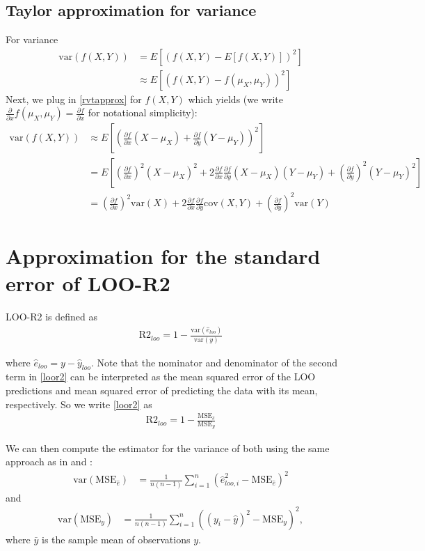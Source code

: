 \documentclass{article}
\begin{document}
\subsection{Taylor approximation for variance}
For variance
\begin{align}
    \text{var}(f(X, Y)) &= E\left[ \left(f(X, Y) - E[f(X,Y)] \right)^2 \right] \nonumber \\
    &\approx E\left[ \left( f(X, Y) - f(\mu_X, \mu_Y) \right)^2 \right] \nonumber
\end{align}
Next, we plug in \eqref{rvtapprox} for $f(X,Y)$ which yields (we write $\frac{\partial }{\partial x} f(\mu_X, \mu_Y) = \frac{\partial f}{\partial x}$ for notational simplicity):
\begin{align}
    \text{var}(f(X, Y)) &\approx E\left[ \left( \frac{\partial f}{\partial x} (X - \mu_X) + \frac{\partial f}{\partial y} (Y - \mu_Y) \right)^2 \right] \nonumber \\
    &= E\left[ \left( \frac{\partial f}{\partial x}  \right)^2 (X - \mu_X)^2 + 2 \frac{\partial f}{\partial x} \frac{\partial f}{\partial y} (X - \mu_X)(Y - \mu_Y) + \left( \frac{\partial f}{\partial y}  \right)^2 (Y - \mu_Y)^2  \right] \nonumber \\
    &= \left( \frac{\partial f}{\partial x}  \right)^2 \text{var}(X) + 2 \frac{\partial f}{\partial x} \frac{\partial f}{\partial y} \text{cov}(X, Y) + \left( \frac{\partial f}{\partial y}  \right)^2 \text{var}(Y) \label{varapprox}
\end{align}

\section{Approximation for the standard error of LOO-R2}
LOO-R2 is defined as
\begin{align}
\text{R2}_{loo} = 1 - \frac{\text{var}(\hat{e}_{loo}) }{ \text{var}(y)} \label{loor2}
\end{align}

where $\hat{e}_{loo} = y - \hat{y}_{loo}$. Note that the nominator and denominator of the second term in \eqref{loor2} can be interpreted as the mean squared error of the LOO predictions and mean squared error of predicting the data with its mean, respectively. So we write \eqref{loor2} as 
\begin{align}
    \text{R2}_{loo} = 1 - \frac{\text{MSE}_{\hat{e}} }{ \text{MSE}_y} \label{mser2}
\end{align}

We can then compute the estimator for the variance of both using the same approach as in \cite{sivula_uncertainty_2022} and \cite{vehtari_practical_2016}:
\begin{align}
    \text{var}(\text{MSE}_{\hat{e}}) &= \frac{1}{n (n-1)} \sum_{i = 1}^n \left( \hat{e}_{loo, i}^2 - \text{MSE}_{\hat{e}} \right)^2 \label{vare}
\end{align}
and
\begin{align}
    \text{var}(\text{MSE}_y) &= \frac{1}{n (n-1)} \sum_{i = 1}^n \left( (y_i - \hat{y})^2 -\text{MSE}_y \right)^2 \label{vary},
\end{align}
where $\bar{y}$ is the sample mean of observations $y$. 
\end{document}
